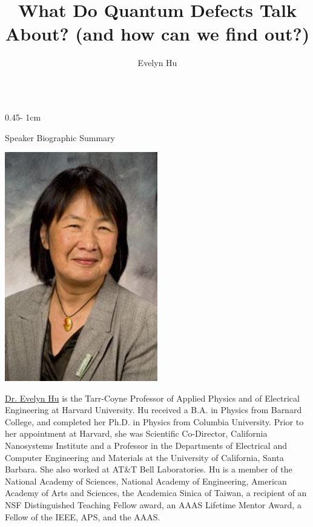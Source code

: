 \documentclass{../psuposter}
\title{What Do Quantum Defects Talk About? (and how can we find out?)}
\author{Evelyn Hu}
\institute{Harvard University}
\begin{document}
\begin{frame}
\begin{columns}[t, totalwidth=\textwidth]
\begin{column}{0.45\textwidth - 1cm}


    \begin{block}{Speaker Biographic Summary}
    	\begin{center}
    		\includegraphics[width=0.5\textwidth]{images/portrait}
    	\end{center}
    	\href{https://hugroup.seas.harvard.edu}{Dr. Evelyn Hu} is the Tarr-Coyne Professor of Applied Physics and of Electrical Engineering at Harvard University. Hu received a B.A. in Physics from Barnard College, and completed her Ph.D. in Physics from Columbia University. Prior to her appointment at Harvard, she was Scientific Co-Director, California Nanosystems Institute and a Professor in the Departments of Electrical and Computer Engineering and Materials at the University of California, Santa Barbara. She also worked at AT\&T Bell Laboratories. Hu is a member of the National Academy of Sciences, National Academy of Engineering, American Academy of Arts and Sciences, the Academica Sinica of Taiwan, a recipient of an NSF Distinguished Teaching Fellow award, an AAAS Lifetime Mentor Award, a Fellow of the IEEE, APS, and the AAAS.
    \end{block}



\end{column}
\end{columns}
\end{frame}
\end{document}
